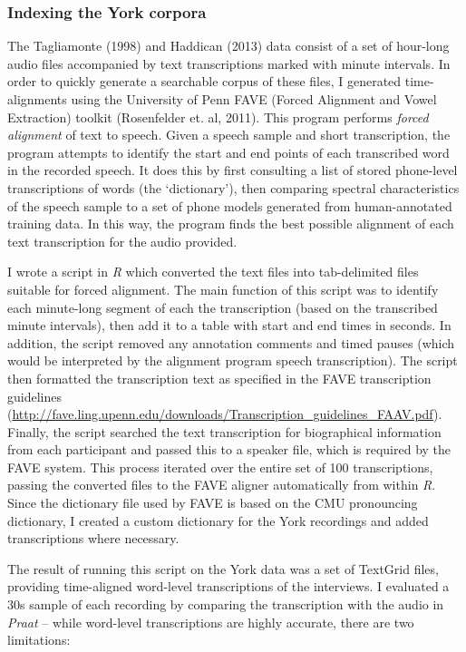 \documentclass{article}
\begin{document}
\subsubsection*{Indexing the York corpora}

The Tagliamonte (1998) and Haddican (2013) data consist of a set of hour-long audio files accompanied by text transcriptions marked with minute intervals. In order to quickly generate a searchable corpus of these files, I generated time-alignments using the University of Penn FAVE (Forced Alignment and Vowel Extraction) toolkit (Rosenfelder et. al, 2011). This program performs \textit{forced alignment} of text to speech. Given a speech sample and short transcription, the program attempts to identify the start and end points of each transcribed word in the recorded speech. It does this by first consulting a list of stored phone-level transcriptions of words (the `dictionary'), then comparing spectral characteristics of the speech sample to a set of phone models generated from human-annotated training data. In this way, the program finds the best possible alignment of each text transcription for the audio provided.


I wrote a script in \textit{R} which converted the text files into tab-delimited files suitable for forced alignment. The main function of this script was to identify each minute-long segment of each the transcription (based on the transcribed minute intervals), then add it to a table with start and end times in seconds. In addition, the script removed any annotation comments and timed pauses (which would be interpreted by the alignment program speech transcription). The script then formatted the transcription text as specified in the FAVE transcription guidelines (\url{http://fave.ling.upenn.edu/downloads/Transcription_guidelines_FAAV.pdf}). Finally, the script searched the text transcription for biographical information from each participant and passed this to a speaker file, which is required by the FAVE system. This process iterated over the entire set of 100 transcriptions, passing the converted files to the FAVE aligner automatically from within \textit{R}. Since the dictionary file used by FAVE is based on the CMU pronouncing dictionary, I created a custom dictionary for the York recordings and added transcriptions where necessary.

The result of running this script on the York data was a set of TextGrid files, providing time-aligned word-level transcriptions of the interviews. I evaluated a 30s sample of each recording by comparing the transcription with the audio in \textit{Praat} -- while word-level transcriptions are highly accurate, there are two limitations:
\end{document}
